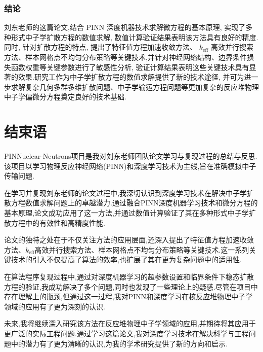 \documentclass{Sichuan Normal University}
\begin{document}
\subsubsection*{结论}
刘东老师的这篇论文,结合 PINN 深度机器技术求解微方程的基本原理, 实现了多种形式中子学扩散方程的数值求解, 数值计算验证结果表明该方法具有良好的精度.同时, 针对扩散方程的特点, 提出了特征值方程加速收敛方法、 $k_{\mathrm{eff}}$ 高效并行搜索方法、样本网格点不均匀分布策略等关键技术,并针对神经网络结构、边界条件损失函数权重等关键参数进行了敏感性分析, 验证计算结果表明这些关键技术具有显著的效果.研究工作为中子学扩散方程的数值求解提供了新的技术途径, 并可为进一步求解复杂几何多群多维扩散问题、中子学输运方程问题等更加复杂的反应堆物理中子学偏微分方程奠定良好的技术基础.


\section{结束语}
PINNuclear-Neutrons项目是我对刘东老师团队论文学习与复现过程的总结与反思.该项目以学习物理反应神经网络(PINN)和深度学习技术为主线,旨在准确模拟中子传输问题.

在学习并复现刘东老师的论文过程中,我深切认识到深度学习技术在解决中子学扩散方程数值求解问题上的卓越潜力.通过融合PINN深度机器学习技术和微分方程的基本原理,论文成功应用了这一方法,并通过数值计算验证了其在多种形式中子学扩散方程中的有效性和高精度性能.

论文的独特之处在于不仅关注方法的应用层面,还深入提出了特征值方程加速收敛方法、$k_{\mathrm{eff}}$高效并行搜索方法、样本网格点不均匀分布策略等关键技术.这一系列关键技术的引入不仅提高了算法的效率,也扩展了其在更为复杂问题中的适用性.

在算法程序复现过程中,通过对深度机器学习的超参数设置和临界条件下稳态扩散方程的验证,我成功解决了多个问题,同时也发现了一些理论上的疑惑.尽管在项目中存在理解上的瓶颈,但通过这一过程,我对PINN和深度学习在核反应堆物理中子学领域的应用有了更为深刻的认识.

未来,我将继续深入研究该方法在反应堆物理中子学领域的应用,并期待将其应用于更广泛的实际工程问题.通过学习这篇论文,我对深度学习技术在解决科学与工程问题中的潜力有了更为清晰的认识,为我的学术研究提供了新的方向和启示.


\end{document}
